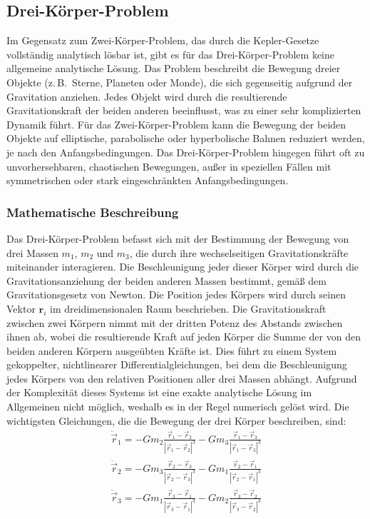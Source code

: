 \documentclass[a4paper,12pt,twoside]{article}
\begin{document}
\subsection{Drei-Körper-Problem}
Im Gegensatz zum Zwei-Körper-Problem, das durch die Kepler-Gesetze vollständig analytisch lösbar ist, gibt es für das Drei-Körper-Problem keine allgemeine analytische Lösung. Das Problem beschreibt die Bewegung dreier Objekte (z.\,B.\ Sterne, Planeten oder Monde), die sich gegenseitig aufgrund der Gravitation anziehen. Jedes Objekt wird durch die resultierende Gravitationskraft der beiden anderen beeinflusst, was zu einer sehr komplizierten Dynamik führt.
Für das Zwei-Körper-Problem kann die Bewegung der beiden Objekte auf elliptische, parabolische oder hyperbolische Bahnen reduziert werden, je nach den Anfangsbedingungen. Das Drei-Körper-Problem hingegen führt oft zu unvorhersehbaren, chaotischen Bewegungen, außer in speziellen Fällen mit symmetrischen oder stark eingeschränkten Anfangsbedingungen.

\subsubsection{Mathematische Beschreibung}
Das Drei-Körper-Problem befasst sich mit der Bestimmung der Bewegung von drei Massen \( m_1 \), \( m_2 \) und \( m_3 \), die durch ihre wechselseitigen Gravitationskräfte miteinander interagieren. Die Beschleunigung jeder dieser Körper wird durch die Gravitationsanziehung der beiden anderen Massen bestimmt, gemäß dem Gravitationsgesetz von Newton. Die Position jedes Körpers wird durch seinen Vektor \( \mathbf{r}_i \) im dreidimensionalen Raum beschrieben. Die Gravitationskraft zwischen zwei Körpern nimmt mit der dritten Potenz des Abstands zwischen ihnen ab, wobei die resultierende Kraft auf jeden Körper die Summe der von den beiden anderen Körpern ausgeübten Kräfte ist. Dies führt zu einem System gekoppelter, nichtlinearer Differentialgleichungen, bei dem die Beschleunigung jedes Körpers von den relativen Positionen aller drei Massen abhängt. Aufgrund der Komplexität dieses Systems ist eine exakte analytische Lösung im Allgemeinen nicht möglich, weshalb es in der Regel numerisch gelöst wird.
Die wichtigsten Gleichungen, die die Bewegung der drei Körper beschreiben, sind:
\begin{align*}
	\ddot{\vec{r}}_1 = -G m_2 \frac{\vec{r}_1 - \vec{r}_2}{|\vec{r}_1 - \vec{r}_2|^3} - G m_3 \frac{\vec{r}_1 - \vec{r}_3}{|\vec{r}_1 - \vec{r}_3|^3} \\
	\ddot{\vec{r}}_2 = -G m_3 \frac{\vec{r}_2 - \vec{r}_3}{|\vec{r}_2 - \vec{r}_3|^3} - G m_1 \frac{\vec{r}_2 - \vec{r}_1}{|\vec{r}_2 - \vec{r}_1|^3} \\
	\ddot{\vec{r}}_3 = -G m_1 \frac{\vec{r}_3 - \vec{r}_1}{|\vec{r}_3 - \vec{r}_1|^3} - G m_2 \frac{\vec{r}_3 - \vec{r}_2}{|\vec{r}_3 - \vec{r}_2|^3}
\end{align*}
\end{document}
